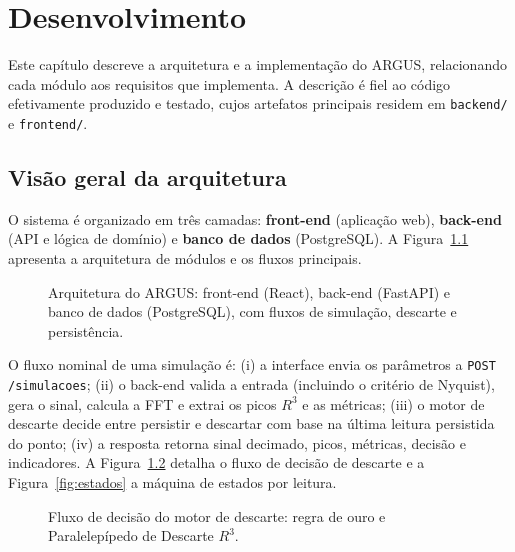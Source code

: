 \chapter{Desenvolvimento}
\label{cap:desenvolvimento}

Este capítulo descreve a arquitetura e a implementação do ARGUS, relacionando
cada módulo aos requisitos que implementa. A descrição é fiel ao código
efetivamente produzido e testado, cujos artefatos principais residem em
\texttt{backend/} e \texttt{frontend/}.

\section{Visão geral da arquitetura}

O sistema é organizado em três camadas: \textbf{front-end} (aplica\c{c}\~ao web),
\textbf{back-end} (API e l\'ogica de dom\'inio) e \textbf{banco de dados}
(PostgreSQL). A Figura~\ref{fig:arquitetura} apresenta a arquitetura de
m\'odulos e os fluxos principais.

\begin{figure}[htbp]
\centering

\caption{Arquitetura do ARGUS: front-end (React), back-end (FastAPI) e banco de dados (PostgreSQL), com fluxos de simulação, descarte e persistência.}
\label{fig:arquitetura}
\par\vspace{2pt}{\footnotesize Fonte: elaboração própria, com base na arquitetura real do projeto.}
\end{figure}

O fluxo nominal de uma simulação é: (i) a interface envia os parâmetros a
\texttt{POST /simulacoes}; (ii) o back-end valida a entrada (incluindo o critério de
Nyquist), gera o sinal, calcula a FFT e extrai os picos \(R^3\) e as métricas;
(iii) o motor de descarte decide entre persistir e descartar com base na
última leitura persistida do ponto; (iv) a resposta retorna sinal decimado,
picos, métricas, decisão e indicadores. A Figura~\ref{fig:fluxo-descarte}
detalha o fluxo de decisão de descarte e a Figura~\ref{fig:estados} a máquina
de estados por leitura.

\begin{figure}[htbp]
\centering

\caption{Fluxo de decisão do motor de descarte: regra de ouro e Paralelepípedo de Descarte \(R^3\).}
\label{fig:fluxo-descarte}
\par{}
\end{figure}

